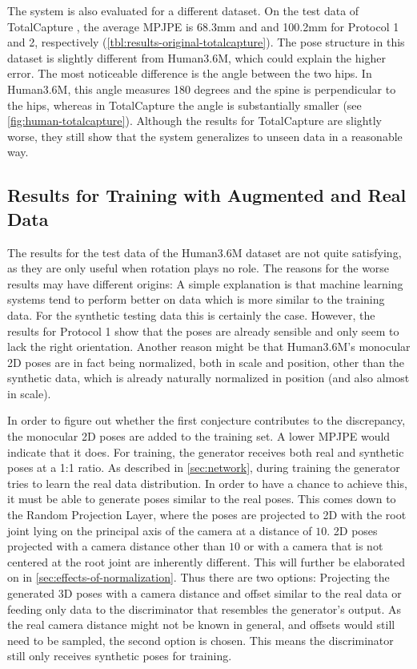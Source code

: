 

The system is also evaluated for a different dataset.
On the test data of TotalCapture \cite{trumble17}, the average MPJPE is 68.3mm and and 100.2mm for Protocol 1 and 2, respectively (\autoref{tbl:results-original-totalcapture}).
The pose structure in this dataset is slightly different from Human3.6M, which could explain the higher error.
The most noticeable difference is the angle between the two hips.
In Human3.6M, this angle measures 180 degrees and the spine is perpendicular to the hips, whereas in TotalCapture the angle is substantially smaller (see \autoref{fig:human-totalcapture}).
Although the results for TotalCapture are slightly worse, they still show that the system generalizes to unseen data in a reasonable way.




\subsection{Results for Training with Augmented and Real Data}
\label{sec:results-augmented}
The results for the test data of the Human3.6M dataset are not quite satisfying, as they are only useful when rotation plays no role.
The reasons for the worse results may have different origins:
A simple explanation is that machine learning systems tend to perform better on data which is more similar to the training data.
For the synthetic testing data this is certainly the case.
However, the results for Protocol 1 show that the poses are already sensible and only seem to lack the right orientation.
Another reason might be that Human3.6M's monocular 2D poses are in fact being normalized, both in scale and position, other than the synthetic data, which is already naturally normalized in position (and also almost in scale).

In order to figure out whether the first conjecture contributes to the discrepancy, the monocular 2D poses are added to the training set.
A lower MPJPE would indicate that it does.
For training, the generator receives both real and synthetic poses at a 1:1 ratio.
As described in \autoref{sec:network}, during training the generator tries to learn the real data distribution.
In order to have a chance to achieve this, it must be able to generate poses similar to the real poses. 
This comes down to the Random Projection Layer, where the poses are projected to 2D with the root joint lying on the principal axis of the camera at a distance of $10$.
2D poses projected with a camera distance other than $10$ or with a camera that is not centered at the root joint are inherently different.
This will further be elaborated on in \autoref{sec:effects-of-normalization}.
Thus there are two options:
Projecting the generated 3D poses with a camera distance and offset similar to the real data or feeding only data to the discriminator that resembles the generator's output.
As the real camera distance might not be known in general, and offsets would still need to be sampled, the second option is chosen.
This means the discriminator still only receives synthetic poses for training.

